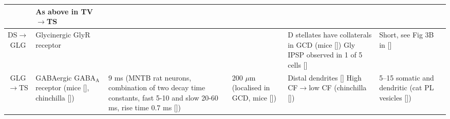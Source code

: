 \begin{longtable}{cYYYYYY}
                                & 
As above in TV\ensuremath{\rightarrow}TS
\\ \midrule
DS\ensuremath{\rightarrow}GLG                                 
                                & 
Glycinergic GlyR receptor                  
                                & %
                                & 
                                & 
D stellates have collaterals in GCD (mice [])
Gly IPSP observed in 1 of 5 cells []    
                                & %
Short, see Fig 3B in []
\\ \midrule
GLG\ensuremath{\rightarrow}TS                         
                                & %
GABAergic GABA$_{\textrm{A}}$ receptor  (mice [], chinchilla [])
                                & %
 9 ms  (MNTB rat neurons, combination of two decay time constants, fast 5-10 and slow 20-60 ms, rise time 0.7 ms [])

                                & %
200 $\mu$m (localised in GCD, mice [])
                                & %
Distal dendrites []
High CF\ensuremath{\rightarrow}low CF (chinchilla [])                        
                                & %
5--15 somatic and dendritic (cat PL vesicles [])     


\end{longtable}
